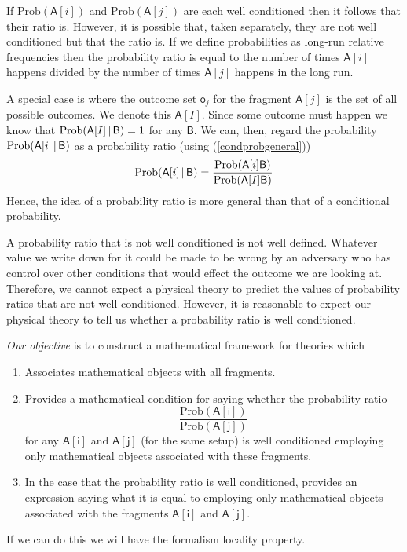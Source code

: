 \documentclass[10pt]{article}
\begin{document}
If $\text{Prob}(\mathsf{A}[i])$ and $\text{Prob}(\mathsf{A}[j])$ are each well conditioned then it follows that their ratio is.  However, it is possible that, taken separately, they are not well conditioned but that the ratio is.  If we define probabilities as long-run relative frequencies then the probability ratio is equal to the number of times $\mathsf{A}[i]$ happens divided by the number of times $\mathsf{A}[j]$ happens in the long run.

A special case is where the outcome set $\mathsf{o}_j$ for the fragment $\mathsf{A}[j]$ is the set of all possible outcomes. We denote this $\mathsf{A}[I]$. Since some outcome must happen we know that $\text{Prob}\mathsf{(A[\mathnormal{I}]\,|\, B)}=1$ for any $\mathsf B$.  We can, then, regard the probability $\text{Prob}(\mathsf{ A[\mathnormal{i}]\,|\,B })$ as a probability ratio (using (\ref{condprobgeneral}))
\begin{equation}\label{ratiotocondition}
\text{Prob}\mathsf{(A[\mathnormal{i}]\,|\,B)}=\frac{\text{Prob}\mathsf{(A[\mathnormal{i}]B)}}{\text{Prob}\mathsf{(A[\mathnormal{I}]B)}}
\end{equation}
Hence, the idea of a probability ratio is more general than that of a conditional probability.

A probability ratio that is not well conditioned is not well defined.  Whatever value we write down for it could be made to be wrong by an adversary who has control over other conditions that would effect the outcome we are looking at.  Therefore, we cannot expect a physical theory to predict the values of probability ratios that are not well conditioned.  However, it is reasonable to expect our physical theory to tell us whether a probability ratio is well conditioned.

\emph{Our objective} is to construct a mathematical framework for theories which
\begin{enumerate}
\item Associates mathematical objects with all fragments.
\item Provides a mathematical condition for saying whether the probability ratio
\[\frac{\text{Prob}\mathsf{(A[i])}}{\text{Prob}\mathsf{(A[j])}}   \]
for any $\mathsf{A[i]}$ and $\mathsf{A[j]}$ (for the same setup) is well conditioned employing only mathematical objects associated with these fragments.
\item In the case that the probability ratio is well conditioned, provides an expression saying what it is equal to employing only mathematical objects associated with the fragments $\mathsf{A[i]}$ and $\mathsf{A[j]}$.
\end{enumerate}
If we can do this we will have the formalism locality property.
\end{document}
